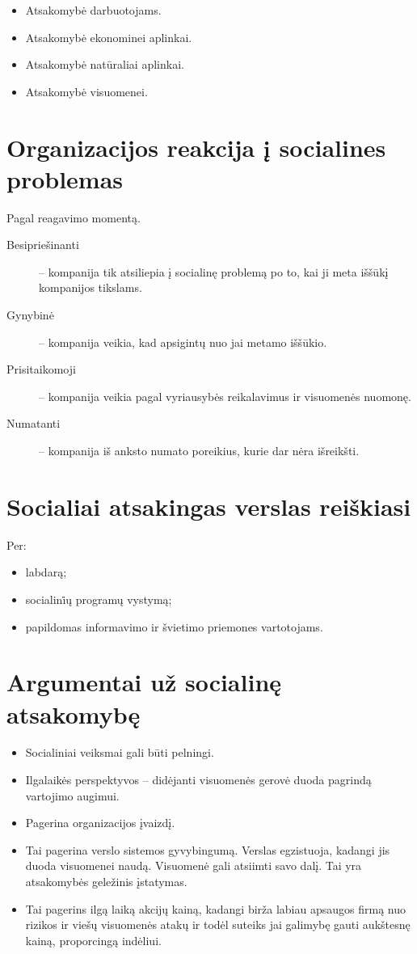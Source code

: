 \begin{itemize}
  \item Atsakomybė darbuotojams.
  \item Atsakomybė ekonominei aplinkai.
  \item Atsakomybė natūraliai aplinkai.
  \item Atsakomybė visuomenei.
\end{itemize}

\section{Organizacijos reakcija į socialines problemas}

Pagal reagavimo momentą.

\begin{description}
  \item[Besipriešinanti] – kompanija tik atsiliepia į socialinę problemą
    po to, kai ji meta iššūkį kompanijos tikslams.
  \item[Gynybinė] – kompanija veikia, kad apsigintų nuo jai metamo
    iššūkio.
  \item[Prisitaikomoji] – kompanija veikia pagal vyriausybės reikalavimus
    ir visuomenės nuomonę.
  \item[Numatanti] – kompanija iš anksto numato poreikius, kurie dar nėra
    išreikšti.
\end{description}

\section{Socialiai atsakingas verslas reiškiasi}

Per:
\begin{itemize}
  \item labdarą;
  \item socialini̇ų programų vystymą;
  \item papildomas informavimo ir švietimo priemones vartotojams.
\end{itemize}

\section{Argumentai už socialinę atsakomybę}

\begin{itemize}
  \item Socialiniai veiksmai gali būti pelningi.
  \item Ilgalaikės perspektyvos – didėjanti visuomenės gerovė duoda
    pagrindą vartojimo augimui.
  \item Pagerina organizacijos įvaizdį.
  \item Tai pagerina verslo sistemos gyvybingumą. Verslas egzistuoja,
    kadangi jis duoda visuomenei naudą. Visuomenė gali atsiimti savo
    dalį. Tai yra atsakomybės geležinis įstatymas.
  \item Tai pagerins ilgą laiką akcijų kainą, kadangi birža labiau
    apsaugos firmą nuo rizikos ir viešų visuomenės atakų ir todėl
    suteiks jai galimybę gauti aukštesnę kainą, proporcingą indėliui.
\end{itemize}

